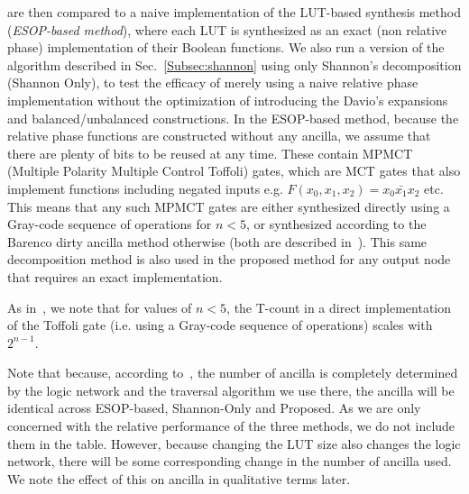  are then compared to a naive implementation of the
LUT-based synthesis method ({\it ESOP-based method}), where each LUT is synthesized as an exact
(non relative phase) implementation of their Boolean functions. We also run a version of the algorithm described
in Sec.~\ref{Subsec:shannon} using only Shannon's decomposition (Shannon Only), to test the efficacy of merely
using a naive relative phase implementation without the optimization of introducing the Davio's expansions and
balanced/unbalanced constructions. In the ESOP-based method, because the relative phase functions are constructed
without any ancilla, we assume that there are plenty of bits to be reused at any time. These contain
MPMCT (Multiple Polarity Multiple Control Toffoli) gates, which are MCT gates that also implement functions
including negated inputs e.g. $F(x_0,x_1,x_2)=x_0\bar{x_1}x_2$ etc. This means that any such MPMCT gates are either
synthesized directly using a Gray-code sequence of operations for $n<5$, or synthesized according to the Barenco
dirty ancilla method otherwise (both are described in~\cite{bib-barenco-elementary}). This same decomposition method is also
used in the proposed method for any output node that requires an exact implementation.

As in~\cite{bib-barenco-elementary}, we note that for values of $n<5$, the T-count in a direct implementation of
the Toffoli gate (i.e. using a Gray-code sequence of operations) scales with $2^{n-1}$.

Note that because, according to~\cite{bib-lhrs-soeken}, the number of ancilla is completely determined by the logic
network and the traversal algorithm we use there, the ancilla will be identical across ESOP-based, Shannon-Only
and Proposed. As we are only concerned with the relative performance of the three methods, we do not include them
in the table. However, because changing the LUT size also changes the logic network, there will be some
corresponding change in the number of ancilla used. We note the effect of this on ancilla in qualitative terms
later.

